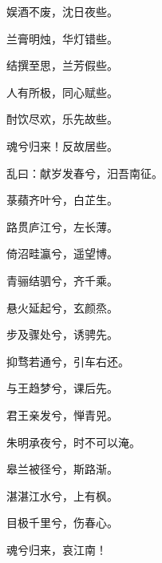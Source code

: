 \documentclass[12pt,a4paper]{ctexbook}
\begin{document}
娱酒不废，沈日夜些。\par
兰膏明烛，华灯错些。\par
结撰至思，兰芳假些。\par
人有所极，同心赋些。\par
酎饮尽欢，乐先故些。\par
魂兮归来！反故居些。\par
乱曰：献岁发春兮，汨吾南征。\par
菉蘋齐叶兮，白芷生。\par
路贯庐江兮，左长薄。\par
倚沼畦瀛兮，遥望博。\par
青骊结驷兮，齐千乘。\par
悬火延起兮，玄颜烝。\par
步及骤处兮，诱骋先。\par
抑骛若通兮，引车右还。\par
与王趋梦兮，课后先。\par
君王亲发兮，惮青兕。\par
朱明承夜兮，时不可以淹。\par
皋兰被径兮，斯路渐。\par
湛湛江水兮，上有枫。\par
目极千里兮，伤春心。\par
魂兮归来，哀江南！\par
\end{document}
